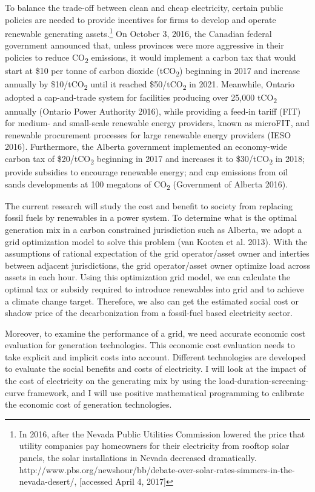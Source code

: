 To balance the trade-off between clean and cheap electricity, certain
public policies are needed to provide incentives for firms to develop
and operate renewable generating assets.\footnote{In 2016, after the
	Nevada Public Utilities Commission lowered the price that utility
	companies pay homeowners for their electricity from rooftop solar
	panels, the solar installations in Nevada decreased dramatically.
	http://www.pbs.org/newshour/bb/debate-over-solar-rates-simmers-in-the-nevada-desert/,
	{[}accessed April 4, 2017{]}} On October 3, 2016, the Canadian federal
government announced that, unless provinces were more aggressive in
their policies to reduce CO\textsubscript{2} emissions, it would
implement a carbon tax that would start at \$10 per tonne of carbon
dioxide (tCO\textsubscript{2}) beginning in 2017 and increase annually
by \$10/tCO\textsubscript{2} until it reached \$50/tCO\textsubscript{2}
in 2021. Meanwhile, Ontario adopted a cap-and-trade system for
facilities producing over 25,000 tCO\textsubscript{2} annually (Ontario
Power Authority 2016), while providing a feed-in tariff (FIT) for
medium- and small-scale renewable energy providers, known as microFIT,
and renewable procurement processes for large renewable energy providers
(IESO 2016). Furthermore, the Alberta government implemented an
economy-wide carbon tax of \$20/tCO\textsubscript{2} beginning in 2017
and increases it to \$30/tCO\textsubscript{2} in 2018; provide subsidies
to encourage renewable energy; and cap emissions from oil sands
developments at 100 megatons of CO\textsubscript{2} (Government of
Alberta 2016).

The current research will study the cost and benefit to society from
replacing fossil fuels by renewables in a power system. To determine
what is the optimal generation mix in a carbon constrained jurisdiction
such as Alberta, we adopt a grid optimization model to solve this
problem (van Kooten et al. 2013). With the assumptions of rational
expectation of the grid operator/asset owner and interties between
adjacent jurisdictions, the grid operator/asset owner optimize load
across assets in each hour. Using this optimization grid model, we can
calculate the optimal tax or subsidy required to introduce renewables
into grid and to achieve a climate change target. Therefore, we also can
get the estimated social cost or shadow price of the decarbonization
from a fossil-fuel based electricity sector.

Moreover, to examine the performance of a grid, we need accurate
economic cost evaluation for generation technologies. This economic cost
evaluation needs to take explicit and implicit costs into account.
Different technologies are developed to evaluate the social benefits and
costs of electricity. I will look at the impact of the cost of
electricity on the generating mix by using the
load-duration-screening-curve framework, and I will use positive
mathematical programming to calibrate the economic cost of generation
technologies.

